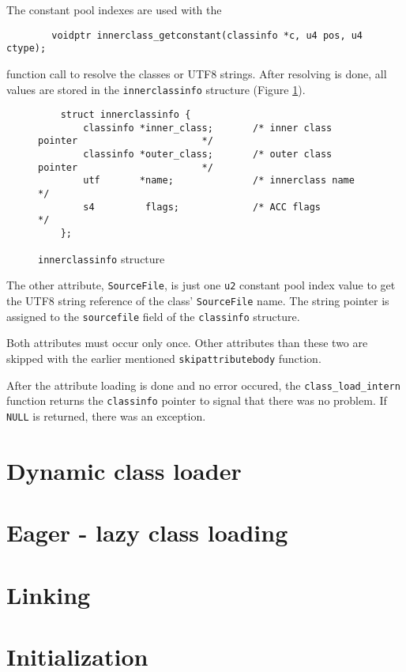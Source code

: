 The constant pool indexes are used with the

\begin{verbatim}
        voidptr innerclass_getconstant(classinfo *c, u4 pos, u4 ctype);
\end{verbatim}

function call to resolve the classes or UTF8 strings. After resolving
is done, all values are stored in the \texttt{innerclassinfo}
structure (Figure \ref{innerclassinfostructure}).

\begin{figure}[h]
\begin{verbatim}
    struct innerclassinfo {
        classinfo *inner_class;       /* inner class pointer                      */
        classinfo *outer_class;       /* outer class pointer                      */
        utf       *name;              /* innerclass name                          */
        s4         flags;             /* ACC flags                                */
    };
\end{verbatim}
\caption{\texttt{innerclassinfo} structure}
\label{innerclassinfostructure}
\end{figure}

The other attribute, \texttt{SourceFile}, is just one \texttt{u2}
constant pool index value to get the UTF8 string reference of the
class' \texttt{SourceFile} name. The string pointer is assigned to the
\texttt{sourcefile} field of the \texttt{classinfo} structure.

Both attributes must occur only once. Other attributes than these two
are skipped with the earlier mentioned \texttt{skipattributebody}
function.

After the attribute loading is done and no error occured, the
\texttt{class\_load\_intern} function returns the \texttt{classinfo}
pointer to signal that there was no problem. If \texttt{NULL} is
returned, there was an exception.


\section{Dynamic class loader}

\section{Eager - lazy class loading}

\section{Linking}

\section{Initialization}
